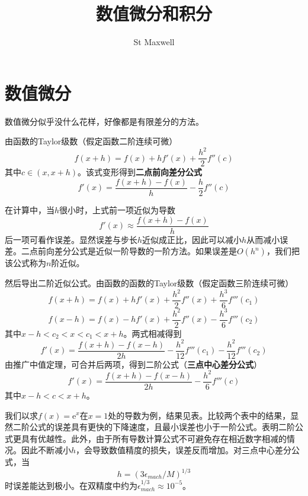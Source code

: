 \documentclass{ctexart}
\title{数值微分和积分}
\author{St Maxwell}
\begin{document}
\maketitle

\section{数值微分}
数值微分似乎没什么花样，好像都是有限差分的方法。

由函数的Taylor级数（假定函数二阶连续可微）
\[
f(x+h) = f(x) + hf'(x) + \frac{h^2}{2}f''(c)
\]
其中$c\in(x,x+h)$。该式变形得到\textbf{二点前向差分公式}
\[
f'(x) = \frac{f(x+h) - f(x)}{h} - \frac{h}{2}f''(c)
\]

在计算中，当$h$很小时，上式前一项近似为导数
\[
f'(x) \approx \frac{f(x+h) - f(x)}{h}
\]
后一项可看作误差。显然误差与步长$h$近似成正比，因此可以减小$h$从而减小误差。二点前向差分公式是近似一阶导数的一阶方法。如果误差是$O(h^n)$，我们把该公式称为$n$阶近似。

然后导出二阶近似公式。由函数的函数的Taylor级数（假定函数三阶连续可微）
\[
f(x+h) = f(x) + hf'(x) + \frac{h^2}{2}f''(x) + \frac{h^3}{6}f'''(c_1)
\]
\[
f(x-h) = f(x) - hf'(x) + \frac{h^2}{2}f''(x) - \frac{h^3}{6}f'''(c_2)
\]
其中$x-h<c_2<x<c_1<x+h$。两式相减得到
\[
f'(x) = \frac{f(x+h) - f(x-h)}{2h} - \frac{h^2}{12}f'''(c_1) - \frac{h^2}{12}f'''(c_2)
\]
由推广中值定理，可合并后两项，得到二阶公式（\textbf{三点中心差分公式}）
\[
f'(x) = \frac{f(x+h) - f(x-h)}{2h} - \frac{h^2}{6}f'''(c)
\]
其中$x-h<c<x+h$。

我们以求$f(x) = \mathrm{e}^x$在$x=1$处的导数为例，结果见表。比较两个表中的结果，显然二阶公式的误差具有更快的下降速度，且最小误差也小于一阶公式。表明二阶公式更具有优越性。此外，由于所有导数计算公式不可避免存在相近数字相减的情况。因此不断减小$h$，会导致数值精度的损失，误差反而增加。对三点中心差分公式，当
\[
h = (3\epsilon_{mach}/M)^{1/3}
\]
时误差能达到极小。在双精度中约为$\epsilon_{mach}^{1/3} \approx 10^{-5}$。
\end{document}
